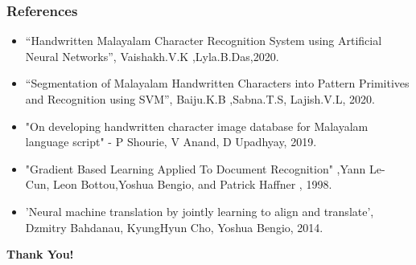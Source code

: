 \documentclass[aspectratio=169]{beamer}
\begin{document}
\begin{frame}
    \frametitle{References}
    \begin{itemize}
 \item “Handwritten Malayalam Character Recognition System using Artificial Neural Networks”,  Vaishakh.V.K ,Lyla.B.Das,2020.
 \item “Segmentation of Malayalam Handwritten Characters into Pattern Primitives and Recognition using SVM”, Baiju.K.B ,Sabna.T.S, Lajish.V.L, 2020.
 \item "On developing handwritten character image database for Malayalam language script" - P Shourie, V Anand, D Upadhyay, 2019.
  \item "Gradient Based Learning Applied To Document Recognition" ,Yann Le-
Cun, Leon Bottou,Yoshua Bengio, and Patrick Haffner , 1998.
 \item 'Neural machine translation by jointly learning to align and translate', Dzmitry Bahdanau, KyungHyun Cho, Yoshua Bengio, 2014.
    \end{itemize}
\end{frame}

\begin{frame}
    \begin{center}
        \Large \textbf{Thank You!}
    \end{center}
\end{frame}
\end{document}

